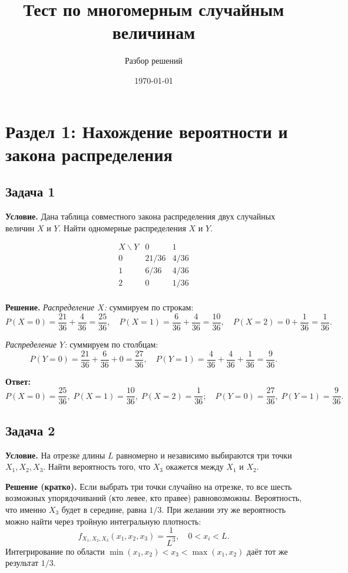 \documentclass[12pt]{article}
\title{Тест по многомерным случайным величинам}
\author{Разбор решений}
\date{\today}
\begin{document}
\maketitle

\section*{Раздел 1: Нахождение вероятности и закона распределения}

\subsection*{Задача 1}
\textbf{Условие.} Дана таблица совместного закона распределения двух случайных величин \(X\) и \(Y\). Найти одномерные распределения \(X\) и \(Y\).

\[
\begin{array}{c|cc}
X \backslash Y & 0 & 1 \\
\hline
0 & 21/36 & 4/36 \\
1 & 6/36 & 4/36 \\
2 & 0 & 1/36 \\
\end{array}
\]

\textbf{Решение.}  
\emph{Распределение \(X\):} суммируем по строкам:
\[
P(X=0) = \frac{21}{36} + \frac{4}{36} = \frac{25}{36},\quad
P(X=1) = \frac{6}{36} + \frac{4}{36} = \frac{10}{36},\quad
P(X=2) = 0 + \frac{1}{36} = \frac{1}{36}.
\]

\emph{Распределение \(Y\):} суммируем по столбцам:
\[
P(Y=0) = \frac{21}{36} + \frac{6}{36} + 0 = \frac{27}{36},\quad
P(Y=1) = \frac{4}{36} + \frac{4}{36} + \frac{1}{36} = \frac{9}{36}.
\]

\textbf{Ответ:}  
\[
P(X=0)=\frac{25}{36},\; P(X=1)=\frac{10}{36},\; P(X=2)=\frac{1}{36};\quad
P(Y=0)=\frac{27}{36},\; P(Y=1)=\frac{9}{36}.
\]

\subsection*{Задача 2}
\textbf{Условие.} На отрезке длины \(L\) равномерно и независимо выбираются три точки \(X_1, X_2, X_3\). Найти вероятность того, что \(X_3\) окажется между \(X_1\) и \(X_2\).

\textbf{Решение (кратко).}  
Если выбрать три точки случайно на отрезке, то все шесть возможных упорядочиваний (кто левее, кто правее) равновозможны. Вероятность, что именно \(X_3\) будет в середине, равна \(1/3\).  
При желании эту же вероятность можно найти через тройную интегральную плотность:
\[
f_{X_1,X_2,X_3}(x_1,x_2,x_3)=\frac{1}{L^3}, \quad 0<x_i<L.
\]
Интегрирование по области \(\min(x_1,x_2)<x_3<\max(x_1,x_2)\) даёт тот же результат \(1/3\).
\end{document}
